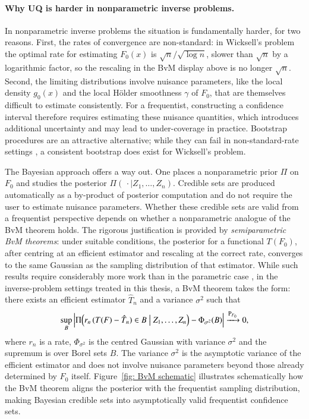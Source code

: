 \paragraph{Why UQ is harder in nonparametric inverse problems.}
In nonparametric inverse problems the situation is fundamentally harder, for two reasons. First, the rates of convergence are non-standard: in Wicksell's problem the optimal rate for estimating $F_0(x)$ is $\sqrt{n}/\sqrt{\log n}$, slower than $\sqrt{n}$ by a logarithmic factor, so the rescaling in the BvM display above is no longer $\sqrt{n}$. Second, the limiting distributions involve nuisance parameters, like the local density $g_0(x)$ and the local H\"{o}lder smoothness $\gamma$ of $F_0$, that are themselves difficult to estimate consistently. For a frequentist, constructing a confidence interval therefore requires estimating these nuisance quantities, which introduces additional uncertainty and may lead to under-coverage in practice. Bootstrap procedures are an attractive alternative; while they can fail in non-standard-rate settings \cite{63}, a consistent bootstrap does exist for Wicksell's problem.

The Bayesian approach offers a way out. One places a nonparametric prior $\Pi$ on $F_0$ and studies the posterior $\Pi(\,\cdot\mid Z_1,\ldots,Z_n)$. Credible sets are produced automatically as a by-product of posterior computation and do not require the user to estimate nuisance parameters. Whether these credible sets are valid from a frequentist perspective depends on whether a nonparametric analogue of the BvM theorem holds. The rigorous justification is provided by \textit{semiparametric BvM theorems}: under suitable conditions, the posterior for a functional $T(F_0)$, after centring at an efficient estimator and rescaling at the correct rate, converges to the same Gaussian as the sampling distribution of that estimator. While such results require considerably more work than in the parametric case \cite{208}, in the inverse-problem settings treated in this thesis, a BvM theorem takes the form: there exists an efficient estimator $\hat{T}_n$ and a variance $\sigma^2$ such that
\[
\sup_{B}\left|\Pi\!\left(r_{n}\,( T(F) - \hat{T}_n) \in B \;\big|\; Z_1,\ldots,Z_n\right) - \Phi_{\sigma^2}(B)\right| \xrightarrow{\mathrm{P}_{F_0}} 0,
\]
where $r_n$ is a rate, $\Phi_{\sigma^2}$ is the centred Gaussian with variance $\sigma^2$ and the supremum is over Borel sets $B$. The variance $\sigma^2$ is the asymptotic variance of the efficient estimator and does not involve nuisance parameters beyond those already determined by $F_0$ itself. Figure~\ref{fig: BvM schematic} illustrates schematically how the BvM theorem aligns the posterior with the frequentist sampling distribution, making Bayesian credible sets into asymptotically valid frequentist confidence sets.

